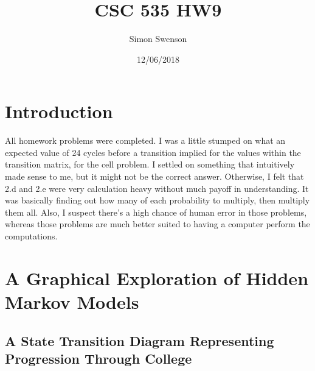 \documentclass{article}
\title{CSC 535 HW9}
\date{12/06/2018}
\author{Simon Swenson}
\begin{document}
\maketitle
{}

\section{Introduction}

All homework problems were completed. I was a little stumped on what an expected 
value of 24 cycles before a transition implied for the values within the 
transition matrix, for the cell problem. I settled on something that intuitively 
made sense to me, but 
it might not be the correct answer. Otherwise, I felt that 2.d and 2.e were very 
calculation heavy without much payoff in understanding. It was basically finding 
out how many of each probability to multiply, then multiply them all. Also, I 
suspect there's a high chance of human error in those problems, whereas those 
problems are much better suited to having a computer perform the computations.

\section{A Graphical Exploration of Hidden Markov Models}

\subsection{A State Transition Diagram Representing Progression Through College}
\end{document}
